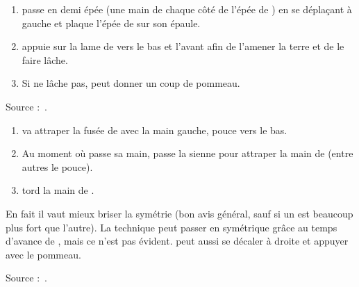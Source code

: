 \begin{technique}

\begin{enumerate}
	\item \A passe en demi épée (une main de chaque côté de l'épée de \D) en se déplaçant à gauche et plaque l'épée de \D sur son épaule.
	\item \A appuie sur la lame de \D vers le bas et l'avant afin de l'amener la terre et de le faire lâche.
	\item Si \D ne lâche pas, \A peut donner un coup de pommeau.
\end{enumerate}

Source :~\cite{petit:dijon:close_longword:2015}.

\end{technique}


\begin{technique}

\begin{enumerate}
	\item \A va attraper la fusée de \D avec la main gauche, pouce vers le bas.
	\item Au moment où \A passe sa main, \D passe la sienne pour attraper la main de \A (entre autres le pouce).
	\item \D tord la main de \A.
\end{enumerate}

En fait il vaut mieux briser la symétrie (bon avis général, sauf si un est beaucoup plus fort que l'autre).
La technique peut passer en symétrique grâce au temps d'avance de \D, mais ce n'est pas évident.
\D peut aussi se décaler à droite et appuyer avec le pommeau.

Source :~\cite{petit:dijon:close_longword:2015}.

\end{technique}

